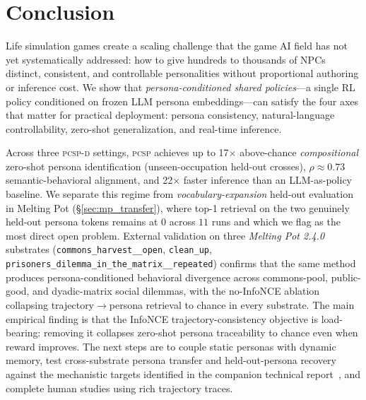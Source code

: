 \documentclass[conference]{IEEEtran}
\newcommand{\PCSP}{\textsc{pcsp}\xspace}
\newcommand{\PCSPD}{\textsc{pcsp-d}\xspace}
\begin{document}
\section{Conclusion}
\label{sec:conclusion}

Life simulation games create a scaling challenge that the game AI field has not
yet systematically addressed: how to give hundreds to thousands of NPCs distinct,
consistent, and controllable personalities without proportional authoring or
inference cost. We show that \emph{persona-conditioned shared
policies}---a single RL policy conditioned on frozen LLM persona
embeddings---can satisfy the four axes that matter for practical deployment:
persona consistency, natural-language controllability, zero-shot
generalization, and real-time inference.

Across three \PCSPD{} settings, \PCSP achieves up to 17$\times$ above-chance
\emph{compositional} zero-shot persona identification (unseen-occupation
held-out crosses), $\rho\!\approx\!0.73$ semantic-behavioral alignment, and
22$\times$ faster inference than an LLM-as-policy baseline. We separate this
regime from \emph{vocabulary-expansion} held-out evaluation in Melting Pot
(\S\ref{sec:mp_transfer}), where top-1 retrieval on the two genuinely held-out
persona tokens remains at $0$ across $11$ runs and which we flag as the most
direct open problem.
External validation on three \textit{Melting Pot 2.4.0} substrates
(\texttt{commons\_harvest\_\_open}, \texttt{clean\_up},
\texttt{prisoners\_dilemma\_in\_the\_matrix\_\_repeated}) confirms that the same
method produces persona-conditioned behavioral divergence across commons-pool,
public-good, and dyadic-matrix social dilemmas, with the no-InfoNCE ablation
collapsing trajectory$\to$persona retrieval to chance in every substrate. The
main empirical finding is that the InfoNCE trajectory-consistency objective is
load-bearing: removing it collapses zero-shot persona traceability to chance
even when reward improves. The next steps are to couple static personas with
dynamic memory, test cross-substrate persona transfer and held-out-persona
recovery against the mechanistic targets identified in the companion technical
report~\cite{phase5report}, and complete human studies using rich trajectory
traces.

\renewcommand{\topfraction}{0.95}
\renewcommand{\bottomfraction}{0.95}
\renewcommand{\textfraction}{0.05}
\renewcommand{\floatpagefraction}{0.80}
\renewcommand{\dbltopfraction}{0.95}
\renewcommand{\dblfloatpagefraction}{0.80}
\setcounter{topnumber}{4}
\setcounter{bottomnumber}{4}
\setcounter{totalnumber}{8}
\appendices
\end{document}
